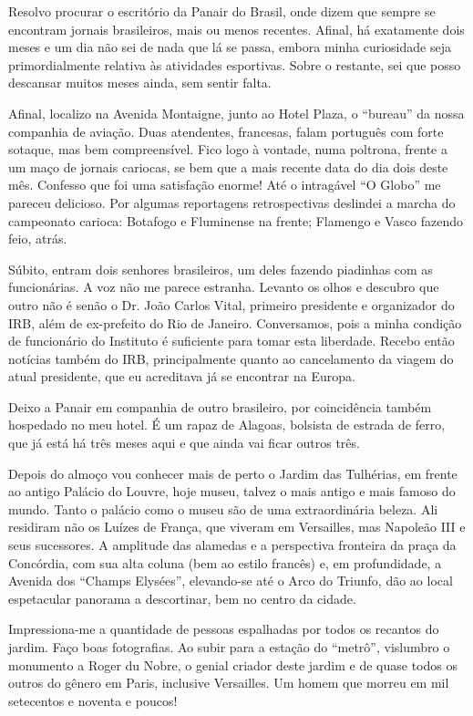 Resolvo procurar o escritório da Panair do Brasil, onde dizem que sempre se encontram jornais brasileiros, mais ou menos recentes. Afinal, há exatamente dois meses e um dia não sei de nada que lá se passa, embora minha curiosidade seja primordialmente relativa às atividades esportivas. Sobre o restante, sei que posso descansar muitos meses ainda, sem sentir falta.

Afinal, localizo na Avenida Montaigne, junto ao Hotel Plaza, o “bureau” da nossa companhia de aviação. Duas atendentes, francesas, falam português com forte sotaque, mas bem compreensível. Fico logo à vontade, numa poltrona, frente a um maço de jornais cariocas, se bem que a mais recente data do dia dois deste mês. Confesso que foi uma satisfação enorme! Até o intragável “O Globo” me pareceu delicioso. Por algumas reportagens retrospectivas deslindei a marcha do campeonato carioca: Botafogo e Fluminense na frente; Flamengo e Vasco fazendo feio, atrás.

Súbito, entram dois senhores brasileiros, um deles fazendo piadinhas com as funcionárias. A voz não me parece estranha. Levanto os olhos e descubro que outro não é senão o Dr. João Carlos Vital, primeiro presidente e organizador do IRB, além de ex-prefeito do Rio de Janeiro. Conversamos, pois a minha condição de funcionário do Instituto é suficiente para tomar esta liberdade. Recebo então notícias também do IRB, principalmente quanto ao cancelamento da viagem do atual presidente, que eu acreditava já se encontrar na Europa.

Deixo a Panair em companhia de outro brasileiro, por coincidência também hospedado no meu hotel. É um rapaz de Alagoas, bolsista de estrada de ferro, que já está há três meses aqui e que ainda vai ficar outros três.

Depois do almoço vou conhecer mais de perto o Jardim das Tulhérias, em frente ao antigo Palácio do Louvre, hoje museu, talvez o mais antigo e mais famoso do mundo. Tanto o palácio como o museu são de uma extraordinária beleza. Ali residiram não os Luízes de França, que viveram em Versailles, mas Napoleão III e seus sucessores. A amplitude das alamedas e a perspectiva fronteira da praça da Concórdia, com sua alta coluna (bem ao estilo francês) e, em profundidade, a Avenida dos “Champs Elysées”, elevando-se até o Arco do Triunfo, dão ao local espetacular panorama a descortinar, bem no centro da cidade.

Impressiona-me a quantidade de pessoas espalhadas por todos os recantos do jardim. Faço boas fotografias. Ao subir para a estação do “metrô”, vislumbro o monumento a Roger du Nobre, o genial criador deste jardim e de quase todos os outros do gênero em Paris, inclusive Versailles. Um homem que morreu em mil setecentos e noventa e poucos!


